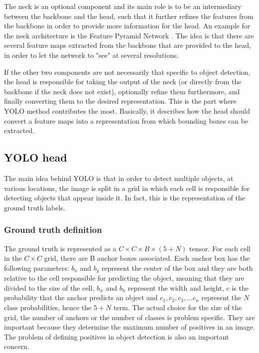 The neck is an optional component and its main role is to be an intermediary between the backbone and the head, such that it further refines the features from the backbone in order to provide more information for the head. An example for the neck architecture is the Feature Pyramid Network \cite{fpn}. The idea is that there are several feature maps extracted from the backbone that are provided to the head, in order to let the network to "see" at several resolutions.

If the other two components are not necessarily that specific to object detection, the head is responsible for taking the output of the neck (or directly from the backbone if the neck does not exist), optionally refine them furthermore, and finally converting them to the desired representation. This is the part where YOLO method contributes the most. Basically, it describes how the head should convert a feature maps into a representation from which bounding boxes can be extracted.

\subsection{YOLO head}

The main idea behind YOLO is that in order to detect multiple objects, at various locations, the image is split in a grid in which each cell is responsible for detecting objects that appear inside it. In fact, this is the representation of the ground truth labels.

\subsubsection{Ground truth definition}

The ground truth is represented as a $C \times C \times B \times (5+N)$ tensor. For each cell in the $C \times C$ grid, there are B anchor boxes associated. Each anchor box has the following parameters: $b_x$ and $b_y$ represent the center of the box and they are both relative to the cell responsible for predicting the object, meaning that they are divided to the size of the cell, $b_w$ and $b_h$ represent the width and height, c is the probability that the anchor predicts an object and $c_1, c_2, c_3, ... c_n$ represent the $N$ class probabilities, hence the $5+N$ term. The actual choice for the size of the grid, the number of anchors or the number of classes is problem specific. They are important because they determine the maximum number of positives in an image. The problem of defining positives in object detection is also an important concern.


